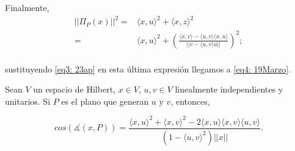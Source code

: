 Finalmente, 
\begin{align*}
|| \Pi_{P}(x) ||^{2} = & 
\langle x,u \rangle^{2} + \langle x,z \rangle^{2} \\
= & \langle x,u \rangle^{2} + 
\left(
\frac{\langle x,v \rangle - \langle u,v \rangle
\langle x,u \rangle}{||v -\langle u,v \rangle u ||}
\right)^{2};\\
\end{align*}

\noindent
sustituyendo \eqref{eq3: 23ap} en esta última expresión
llegamos a \eqref{eq4: 19Marzo}.

\QEDB
\vspace{0.2cm}

\begin{prop}
Sean $V$ un espacio de Hilbert, $x \in V$,
	$u,v \in V$ linealmente independientes
	y unitarios. Si $P$ es el plano
	que generan $u$ y $v$, entonces,
	
\begin{equation}
\label{eq: coseno a plano}
cos (\measuredangle (x, P)) = 
\frac{\langle x, u \rangle^{2} +  \langle x, v \rangle^{2}	
	       -2  \langle x, u \rangle \langle x, v \rangle \langle u, v \rangle	}{
	       (1- \langle u, v 	\rangle^{2}) ||x||}.
\end{equation}
\end{prop}
